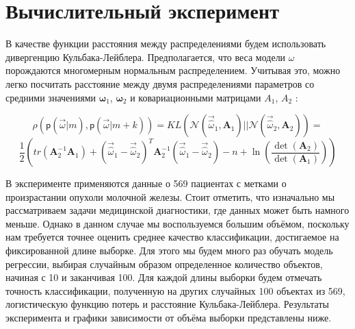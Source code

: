 \documentclass[12pt,twoside]{article}
\begin{document}
\section{Вычислительный эксперимент}
В качестве функции расстояния между распределениями будем использовать дивергенцию Кульбака-Лейблера. Предполагается, что веса модели $\omega$ порождаются многомерным нормальным распределением. Учитывая это, можно легко посчитать расстояние между двумя распределениями параметров со средними значениями $\boldsymbol { \omega } _ { 1 }$, $\boldsymbol { \omega } _ { 2 }$ и ковариационными матрицами $A _ { 1 }$, $A _ { 2 }$ :

$$\rho (\mathsf{p}(\vec{\omega}|m), \mathsf{p}(\vec{\omega}|m+k)) = KL(\mathcal{N}(\vec{\hat \omega}_1, \boldsymbol{A}_1)||\mathcal{N}(\vec{\hat \omega}_2, \boldsymbol{A}_2)) =$$
$$\frac{1}{2}\left( tr(\boldsymbol{A}_2^{-1} \boldsymbol{A}_1) + (\vec{\hat \omega}_1 - \vec{\hat \omega}_2)^T \boldsymbol{A}_2^{-1}(\vec{\hat \omega}_1 - \vec{\hat \omega}_2) - n + \ln\left(\frac{\det(\boldsymbol{A}_2)}{\det(\boldsymbol{A}_1)}\right) \right)$$

В эксперименте применяются данные о 569 пациентах с метками о произрастании опухоли молочной железы. Стоит отметить, что изначально мы рассматриваем задачи медицинской диагностики, где данных может быть намного меньше. Однако в данном случае мы воспользуемся большим объёмом, поскольку нам требуется точнее оценить среднее качество классификации, достигаемое на фиксированной длине выборке. Для этого мы будем много раз обучать модель регрессии, выбирая случайным образом определенное количество объектов, начиная с 10 и заканчивая 100. Для каждой длины выборки будем отмечать точность классификации, полученную на других случайных 100 объектах из 569, логистическую функцию потерь и расстояние Кульбака-Лейблера. Результаты эксперимента и графики зависимости от объёма выборки представлены ниже.

\begin{figure}[h]
	\\
	\label{fg:Acc}
\end{figure}
\end{document}
